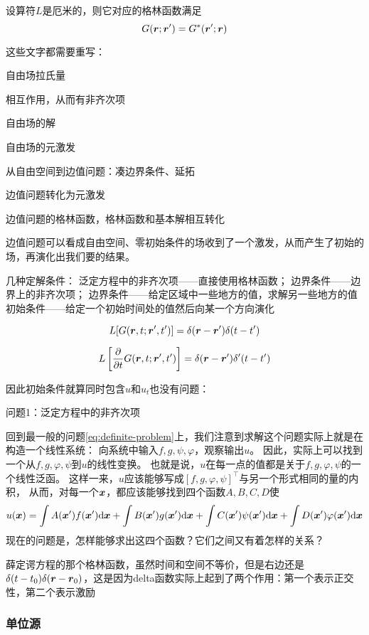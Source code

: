 \documentclass[UTF8]{ctexart}
\renewenvironment{enumerate}{\begin{compactenum}}{\end{compactenum}}
\begin{document}
设算符$L$是厄米的，则它对应的格林函数满足
\[
    G(\vb*{r};\vb*{r}') = G^*(\vb*{r}';\vb*{r})
\]

这些文字都需要重写：
\begin{enumerate}
    \item 自由场拉氏量
    \item 相互作用，从而有非齐次项
    \item 自由场的解
    \item 自由场的元激发
    \item 从自由空间到边值问题：凑边界条件、延拓
    \item 边值问题转化为元激发
    \item 边值问题的格林函数，格林函数和基本解相互转化
\end{enumerate}

边值问题可以看成自由空间、零初始条件的场收到了一个激发，从而产生了初始的场，再演化出我们要的结果。

几种定解条件：
泛定方程中的非齐次项——直接使用格林函数；
边界条件——边界上的非齐次项；
边界条件——给定区域中一些地方的值，求解另一些地方的值
初始条件——给定一个初始时间处的值然后向某一个方向演化

\[
    L[G(\vb*{r}, t; \vb*{r}', t')] = \delta(\vb*{r}-\vb*{r}')\delta(t-t')
\]

\[
    L\left[\pdv{t} G(\vb*{r}, t; \vb*{r}', t')\right] = \delta(\vb*{r}-\vb*{r}')\delta'(t-t')
\]

因此初始条件就算同时包含$u$和$u_t$也没有问题：

问题1：泛定方程中的非齐次项

回到最一般的问题\eqref{eq:definite-problem}上，我们注意到求解这个问题实际上就是在构造一个线性系统：
向系统中输入$f, g, \psi, \varphi$，观察输出$u$。
因此，实际上可以找到一个从$f, g, \varphi, \psi$到$u$的线性变换。
也就是说，$u$在每一点的值都是关于$f, g, \varphi, \psi$的一个线性泛函。
这样一来，$u$应该能够写成$[f, g, \varphi, \psi]^\top$与另一个形式相同的量的内积，
从而，对每一个$\vb*{x}$，都应该能够找到四个函数$A,B,C,D$使
\[
    u(\vb*{x}) = \int A(\vb*{x}') f(\vb*{x}') \dd \vb*{x} + \int B(\vb*{x}') g(\vb*{x}') \dd \vb*{x}
    + \int C(\vb*{x}') \psi(\vb*{x}') \dd \vb*{x} + \int D(\vb*{x}') \varphi(\vb*{x}') \dd \vb*{x}
\]
现在的问题是，怎样能够求出这四个函数？它们之间又有着怎样的关系？

薛定谔方程的那个格林函数，虽然时间和空间不等价，但是右边还是
$\delta(t-t_0)\delta(\vb*{r}-\vb*{r}_0)$，这是因为delta函数实际上起到了两个作用：第一个表示正交性，第二个表示激励

\subsubsection{单位源}
\end{document}
